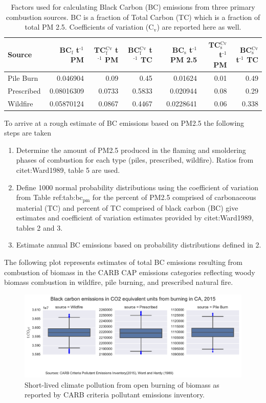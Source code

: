 \documentclass[a4paper]{article}
\begin{document}
\begin{table}[htb]
\caption{Factors used for calculating Black Carbon (BC) emissions from three primary combustion sources. BC is a fraction of Total Carbon (TC) which is a fraction of total PM 2.5. Coefficients of variation (C$_{\text{v}}$) are reported here as well.}
\centering
\begin{tabular}{lrrrrrr}
Source & BC$_{\text{f}}$ t$^{\text{-1}}$ PM & TC$_{\text{f}}^{\text{Cv}}$ t$^{\text{-1}}$ PM & BC$_{\text{f}}^{\text{Cv}}$ t$^{\text{-1}}$ TC & BC$_{\text{s}}$ t$^{\text{-1}}$ PM 2.5 & TC$_{\text{s}}^{\text{Cv}}$ t$^{\text{-1}}$ PM & BC$_{\text{s}}^{\text{Cv}}$ t$^{\text{-1}}$ TC\\
\hline
Pile Burn & 0.046904 & 0.09 & 0.45 & 0.01624 & 0.01 & 0.49\\
Prescribed & 0.08016309 & 0.0733 & 0.5833 & 0.020944 & 0.08 & 0.29\\
Wildfire & 0.05870124 & 0.0867 & 0.4467 & 0.0228641 & 0.06 & 0.338\\
\end{tabular}
\end{table}



To arrive at a rough estimate of BC emissions based on PM2.5 the
following steps are taken

\begin{enumerate}
\item Determine the amount of PM2.5 produced in the flaming and smoldering
phases of combustion for each type (piles, prescribed,
wildfire). Ratios from citet:Ward1989, table 5 are used.
\item Define 1000 normal probability distributions using the coefficient
of variation from Table ref:tab:bc$_{\text{pm}}$ for the percent of PM2.5
comprised of carbonaceous material (TC) and percent of TC comprised
of black carbon (BC) give estimates and coefficient of variation
estimates provided by citet:Ward1989, tables 2 and 3.
\item Estimate annual BC emissions based on probability distributions
defined in 2.
\end{enumerate}

The following plot represents estimates of total BC emissions resulting
from combustion of biomass in the CARB CAP emissions categories
reflecting woody biomass combustion in wildfire, pile burning, and
prescribed natural fire.

\begin{figure}[htb]
\centering
\includegraphics[width=\textwidth]{./graphics/bc_prob_gwp.pdf}
\caption{Short-lived climate pollution from open burning of biomass as reported by CARB criteria pollutant emissions inventory.}
\end{figure}
\end{document}
